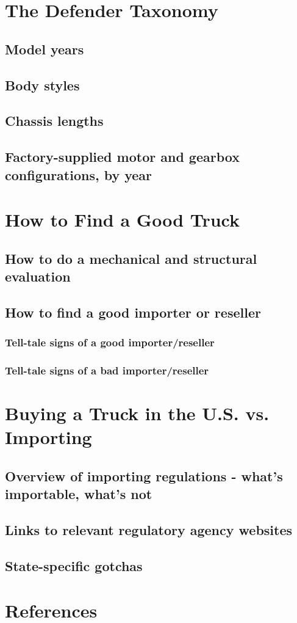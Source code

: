 \documentclass{article}
\begin{document}
\section{The Defender Taxonomy}
\subsection{Model years}
\subsection{Body styles}
\subsection{Chassis lengths}
\subsection{Factory-supplied motor and gearbox configurations, by year}

\section{How to Find a Good Truck}
\subsection{How to do a mechanical and structural evaluation}
\subsection{How to find a good importer or reseller}
\subsubsection{Tell-tale signs of a good importer/reseller}
\subsubsection{Tell-tale signs of a bad importer/reseller}

\section{Buying a Truck in the U.S. vs. Importing}
\subsection{Overview of importing regulations - what's importable, what's not}
\subsection{Links to relevant regulatory agency websites}
\subsection{State-specific gotchas}

\section{References}
\end{document}
